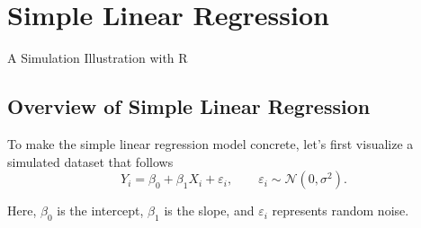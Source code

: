 \documentclass[
  letterpaper,
]{scrbook}
\newenvironment{Shaded}{\begin{snugshade}}{\end{snugshade}}
\newcommand{\AttributeTok}[1]{\textcolor[rgb]{0.40,0.45,0.13}{#1}}
\newcommand{\ConstantTok}[1]{\textcolor[rgb]{0.56,0.35,0.01}{#1}}
\newcommand{\DecValTok}[1]{\textcolor[rgb]{0.68,0.00,0.00}{#1}}
\newcommand{\FunctionTok}[1]{\textcolor[rgb]{0.28,0.35,0.67}{#1}}
\newcommand{\NormalTok}[1]{\textcolor[rgb]{0.00,0.23,0.31}{#1}}
\newcommand{\SpecialCharTok}[1]{\textcolor[rgb]{0.37,0.37,0.37}{#1}}
\newcommand{\StringTok}[1]{\textcolor[rgb]{0.13,0.47,0.30}{#1}}
\begin{document}

\chapter{Simple Linear Regression}\label{simple-linear-regression}

A Simulation Illustration with R

\hfill\break

\begin{Shaded}
\end{Shaded}

\section{Overview of Simple Linear
Regression}\label{overview-of-simple-linear-regression}

To make the simple linear regression model concrete, let's first
visualize a simulated dataset that follows \[
Y_i = \beta_0 + \beta_1 X_i + \varepsilon_i, \qquad
\varepsilon_i \sim \mathcal N(0, \sigma^2).
\]

Here, \(\beta_0\) is the intercept, \(\beta_1\) is the slope, and
\(\varepsilon_i\) represents random noise.
\end{document}
